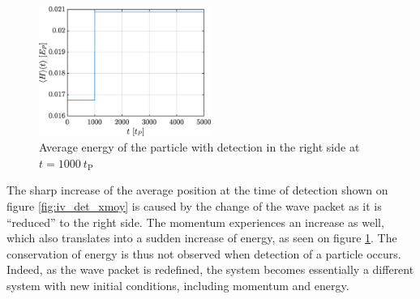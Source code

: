 \documentclass[a4paper,12pt,twoside]{article}
\begin{document}
\begin{figure}[h!]
\centering
 \includegraphics[width=0.5\textwidth]{graphs/iv_det_H.eps}
 \caption{Average energy of the particle with detection in the right side at $t=1000~t_\text{P}$}
 \label{fig:iv_det_H}
\end{figure}

The sharp increase of the average position at the time of detection shown on figure \ref{fig:iv_det_xmoy} is caused by the change of the wave packet as it is ``reduced'' to the right side. The momentum experiences an increase as well, which also translates into a sudden increase of energy, as seen on figure \ref{fig:iv_det_H}. The conservation of energy is thus not observed when detection of a particle occurs. Indeed, as the wave packet is redefined, the system becomes essentially a different system with new initial conditions, including momentum and energy.
\end{document}
